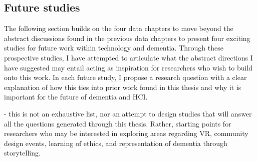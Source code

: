 \subsection{Future studies}
\label{FutureStudies}
The following section builds on the four data chapters to move beyond the abstract discussions found in the previous data chapters to present four exciting studies for future work within technology and dementia. Through these prospective studies, I have attempted to articulate what the abstract directions I have suggested may entail acting as inspiration for researchers who wish to build onto this work. In each future study, I propose a research question with a clear explanation of how this ties into prior work found in this thesis and why it is important for the future of dementia and HCI.

- this is not an exhaustive list, nor an attempt to design studies that will answer all the questions generated through this thesis. Rather, starting points for researchers who may be interested in exploring areas regarding VR, community design events, learning of ethics, and representation of dementia through storytelling. 

